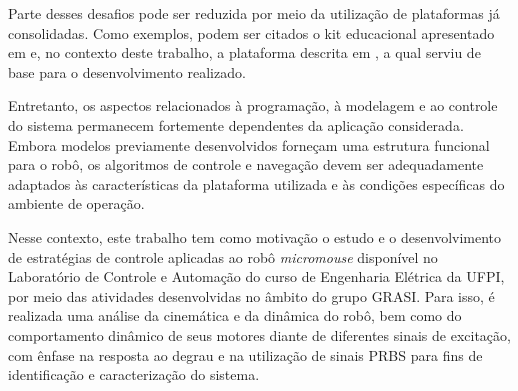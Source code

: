 
        Parte desses desafios pode ser reduzida por meio da utilização de plataformas já consolidadas. Como exemplos, podem ser citados o kit educacional apresentado em  e, no contexto deste trabalho, a plataforma descrita em , a qual serviu de base para o desenvolvimento realizado.


        Entretanto, os aspectos relacionados à programação, à modelagem e ao controle do sistema permanecem fortemente dependentes da aplicação considerada. Embora modelos previamente desenvolvidos forneçam uma estrutura funcional para o robô, os algoritmos de controle e navegação devem ser adequadamente adaptados às características da plataforma utilizada e às condições específicas do ambiente de operação.


        Nesse contexto, este trabalho tem como motivação o estudo e o desenvolvimento de estratégias de controle aplicadas ao robô \textit{micromouse} disponível no Laboratório de Controle e Automação do curso de Engenharia Elétrica da \gls{UFPI}, por meio das atividades desenvolvidas no âmbito do grupo \gls{GRASI}. Para isso, é realizada uma análise da cinemática e da dinâmica do robô, bem como do comportamento dinâmico de seus motores diante de diferentes sinais de excitação, com ênfase na resposta ao degrau e na utilização de sinais \gls{PRBS} para fins de identificação e caracterização do sistema.

